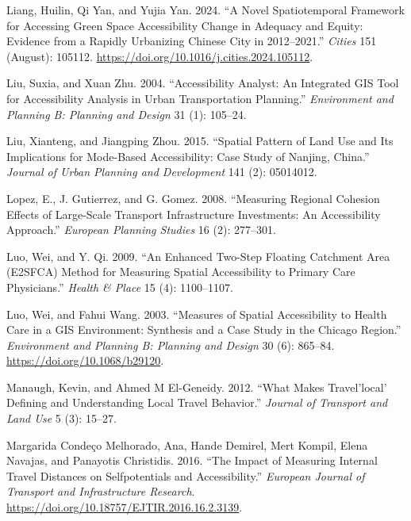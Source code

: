 \documentclass[
]{article}
\newlength{\cslhangindent}
\newenvironment{CSLReferences}[2] %
 {\begin{list}{}{%
  \setlength{\itemindent}{0pt}
  \setlength{\leftmargin}{0pt}
  \setlength{\parsep}{0pt}
  \ifodd #1
   \setlength{\leftmargin}{\cslhangindent}
   \setlength{\itemindent}{-1\cslhangindent}
  \fi
  \setlength{\itemsep}{#2\baselineskip}}}
 {\end{list}}
\begin{document}
\begin{CSLReferences}{1}{0}
Liang, Huilin, Qi Yan, and Yujia Yan. 2024. {``A Novel Spatiotemporal
Framework for Accessing Green Space Accessibility Change in Adequacy and
Equity: {Evidence} from a Rapidly Urbanizing {Chinese} {City} in
2012--2021.''} \emph{Cities} 151 (August): 105112.
\url{https://doi.org/10.1016/j.cities.2024.105112}.

Liu, Suxia, and Xuan Zhu. 2004. {``Accessibility Analyst: An Integrated
GIS Tool for Accessibility Analysis in Urban Transportation Planning.''}
\emph{Environment and Planning B: Planning and Design} 31 (1): 105--24.

Liu, Xianteng, and Jiangping Zhou. 2015. {``Spatial Pattern of Land Use
and Its Implications for Mode-Based Accessibility: Case Study of
Nanjing, China.''} \emph{Journal of Urban Planning and Development} 141
(2): 05014012.

Lopez, E., J. Gutierrez, and G. Gomez. 2008. {``Measuring Regional
Cohesion Effects of Large-Scale Transport Infrastructure Investments:
{An} Accessibility Approach.''} \emph{European Planning Studies} 16 (2):
277--301.

Luo, Wei, and Y. Qi. 2009. {``An Enhanced Two-Step Floating Catchment
Area ({E2SFCA}) Method for Measuring Spatial Accessibility to Primary
Care Physicians.''} \emph{Health \& Place} 15 (4): 1100--1107.

Luo, Wei, and Fahui Wang. 2003. {``Measures of Spatial Accessibility to
Health Care in a GIS Environment: Synthesis and a Case Study in the
Chicago Region.''} \emph{Environment and Planning B: Planning and
Design} 30 (6): 865--84. \url{https://doi.org/10.1068/b29120}.

Manaugh, Kevin, and Ahmed M El-Geneidy. 2012. {``What Makes
Travel'local' Defining and Understanding Local Travel Behavior.''}
\emph{Journal of Transport and Land Use} 5 (3): 15--27.

Margarida Condeço Melhorado, Ana, Hande Demirel, Mert Kompil, Elena
Navajas, and Panayotis Christidis. 2016. {``The Impact of Measuring
Internal Travel Distances on Selfpotentials and Accessibility.''}
\emph{European Journal of Transport and Infrastructure Research}.
\url{https://doi.org/10.18757/EJTIR.2016.16.2.3139}.


\end{CSLReferences}
\end{document}
